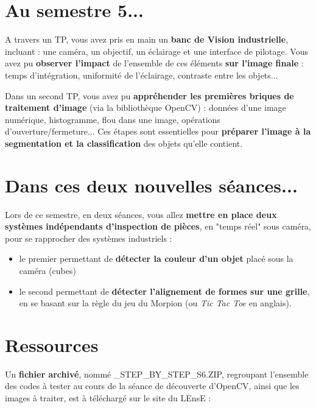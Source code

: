 \documentclass[a4paper,12pt,titlepage]{article} %
\begin{document}
\newpage
\section{Au semestre 5...}

A travers un TP, vous avez pris en main un \textbf{banc de Vision industrielle}, incluant : une caméra, un objectif, un éclairage et une interface de pilotage. Vous avez pu \textbf{observer l'impact} de l'ensemble de ces éléments \textbf{sur l'image finale} : temps d'intégration, uniformité de l'éclairage, contraste entre les objets...

\medskip

Dans un second TP, vous avez pu \textbf{appréhender les premières briques de traitement d'image} (via la bibliothèque OpenCV) : données d'une image numérique, histogramme, flou dans une image, opérations d'ouverture/fermeture... Ces étapes sont essentielles pour \textbf{préparer l'image à la segmentation et la classification} des objets qu'elle contient.

\medskip

\section{Dans ces deux nouvelles séances...}

Lors de ce semestre, en deux séances, vous allez \textbf{mettre en place deux systèmes indépendants d'inspection de pièces}, en "temps réel" sous caméra, pour se rapprocher des systèmes industriels :

\medskip

\begin{itemize}
	\item le premier permettant de \textbf{détecter la couleur d'un objet} placé sous la caméra (cubes)
	\item le second permettant de \textbf{détecter l'alignement de formes sur une grille}, en se basant sur la règle du jeu du Morpion (ou \textit{Tic Tac Toe} en anglais).
\end{itemize}




\section{Ressources}

Un \textbf{fichier archivé}, nommé \_STEP\_BY\_STEP\_S6.ZIP, regroupant l'ensemble des codes à tester au cours de la séance de découverte d'OpenCV, ainsi que les images à traiter, est à téléchargé sur le site du LEnsE : 
\end{document}
